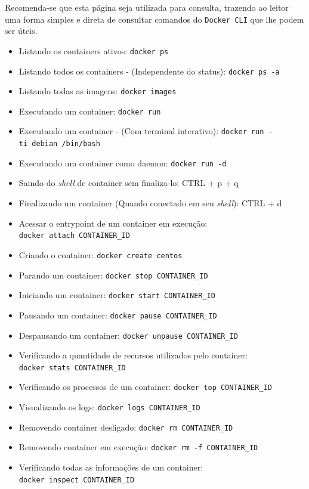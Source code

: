 \documentclass[]{article}
\begin{document}
Recomenda-se que esta página seja utilizada para consulta, trazendo ao leitor uma forma simples e direta de consultar comandos do \texttt{Docker\ CLI} que lhe podem ser úteis.

\begin{itemize}
\item
  Listando os containers ativos: \texttt{docker\ ps}
\item
  Listando todos os containers - (Independente do status): \texttt{docker\ ps\ -a}
\item
  Listando todas as imagens: \texttt{docker\ images}
\item
  Executando um container: \texttt{docker\ run}
\item
  Executando um container - (Com terminal interativo): \texttt{docker\ run\ -ti\ debian\ /bin/bash}
\item
  Executando um container como daemon: \texttt{docker\ run\ -d}
\item
  Saindo do \emph{shell} de container sem finaliza-lo: CTRL + p + q
\item
  Finalizando um container (Quando conectado em seu \emph{shell}): CTRL + d
\item
  Acessar o entrypoint de um container em execução: \texttt{docker\ attach\ CONTAINER\_ID}
\item
  Criando o container: \texttt{docker\ create\ centos}
\item
  Parando um container: \texttt{docker\ stop\ CONTAINER\_ID}
\item
  Iniciando um container: \texttt{docker\ start\ CONTAINER\_ID}
\item
  Pausando um container: \texttt{docker\ pause\ CONTAINER\_ID}
\item
  Despausando um container: \texttt{docker\ unpause\ CONTAINER\_ID}
\item
  Verificando a quantidade de recursos utilizados pelo container: \texttt{docker\ stats\ CONTAINER\_ID}
\item
  Verificando os processos de um container: \texttt{docker\ top\ CONTAINER\_ID}
\item
  Visualizando os logs: \texttt{docker\ logs\ CONTAINER\_ID}
\item
  Removendo container desligado: \texttt{docker\ rm\ CONTAINER\_ID}
\item
  Removendo container em execução: \texttt{docker\ rm\ -f\ CONTAINER\_ID}
\item
  Verificando todas as informações de um container: \texttt{docker\ inspect\ CONTAINER\_ID}

\end{itemize}
\end{document}
